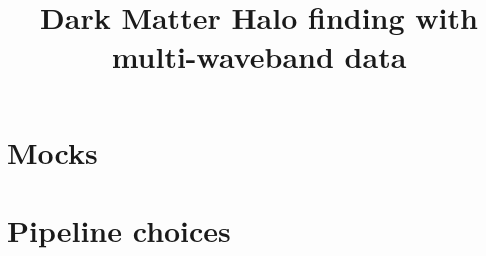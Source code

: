 \documentclass[11pt]{article}
\begin{document}
    \title{Dark Matter Halo finding with multi-waveband data}

    \section{\label{sc:mock}Mocks}
    

    \section{\label{sc:pipeline}Pipeline choices}
    

    
    
\end{document}

